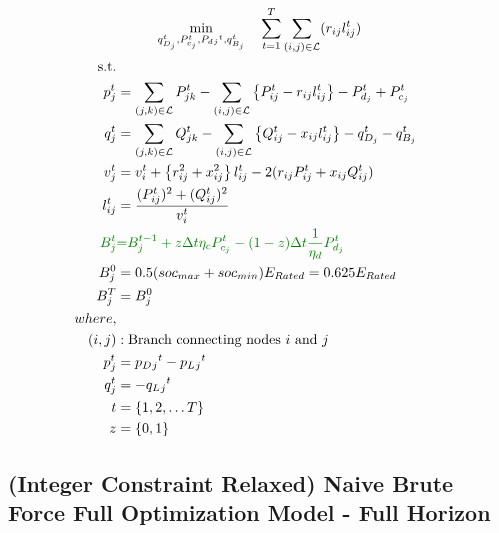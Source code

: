 \begin{gather}
    \min_{q_{D_j}^t,
	P_{c_j}^t, P_d{_j}^t, q_{B_j}^t} \quad
	\sum_{t = 1}^{T} \sum_{(i, j) \in \mathcal{L}} (r_{ij}l_{ij}^t) \\
	\begin{align}
		\text{s.t.} & {}\nonumber \\
		{p_j^t} & = {\sum_{(j, k) \in \mathcal{L}} P_{jk}^t - \sum_{(i, j) \in \mathcal{L}}\left\{P_{ij}^t - r_{ij}l_{ij}^t\right\} - P_{d_j}^t + P_{c_j}^t} && \\
		{q_j^t} & = {\sum_{(j, k) \in \mathcal{L}} Q_{jk}^t - \sum_{(i, j) \in \mathcal{L}}\left\{Q_{ij}^t - x_{ij}l_{ij}^t\right\} - q_{D_j}^t - q_{B_j}^t} && \\
		{v_j^t} & = {v_{i}^t +  \left\{r_{ij}^2 + x_{ij}^2\right\}l_{ij}^t - 2(r_{ij}P_{ij}^t + x_{ij}Q_{ij}^t)} && \\
		{l_{ij}^t} & = {\frac{(P_{ij}^{t})^2 + (Q_{ij}^{t})^2}{v_i^t}} \\
		{\color{darkgreen}{ B_{j}^{t} }} &\color{darkgreen}{=} { \color{darkgreen}{ B_{j}^{t-1} + z \Delta t  \eta_c P_{c_j}^t - (1-z) \Delta t\frac{1}{\eta_d} P_{d_j}^t } } \\
		{ B_{j}^{0} } &= { 0.5(soc_{max}+soc_{min})E_{Rated} = 0.625E_{Rated}} \\
		{ B_{j}^{T} } &= { B_{j}^{0}} \\
		{where,} & {} \\
		{(i, j)} &: {\text{Branch connecting nodes $i$ and $j$}} \\
		{p_j^t} &= {p_D{_j}^t - p_L{_j}^t} \\
		{q_j^t} &= {-q_L{_j}^t} \\
		{t} &= {\{1, 2, \ldots T\}} \\
		{z} &= {\{0, 1\}}
	\end{align}
\end{gather}

\subsection*{(Integer Constraint Relaxed) Naive Brute Force Full Optimization Model - Full Horizon}



